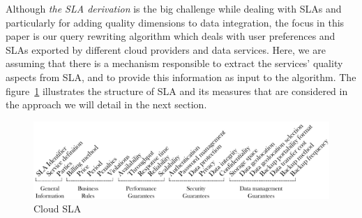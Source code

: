 Although \textit{the SLA derivation} is the big challenge while dealing with
SLAs and particularly for adding quality dimensions to data integration, the
focus in this paper is our query rewriting algorithm which deals with user
preferences and SLAs exported by different cloud providers and data services.
Here, we are assuming that there is a mechanism responsible to extract the
services' quality aspects from SLA, and to provide this information as input to
the algorithm. The figure~\ref{fig:cloudsla} illustrates the structure of SLA
and its measures that are considered in the approach we will detail in the next
section.   

\begin{figure}[h!]
\center
\includegraphics[scale=0.57]{Cloud_SLA.pdf}
\caption{Cloud SLA}\label{fig:cloudsla}
\end{figure}